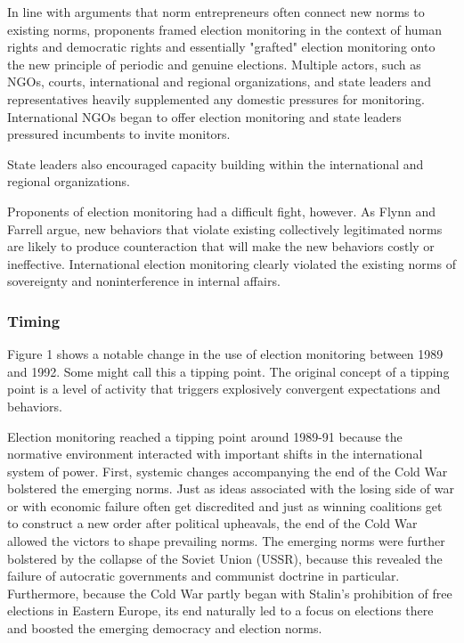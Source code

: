 In line with arguments that norm entrepreneurs often connect new norms to existing norms, proponents framed election monitoring in the context of human rights and democratic rights and essentially "grafted" election monitoring onto the new principle of periodic and genuine elections. Multiple actors, such as NGOs, courts, international and regional organizations, and state leaders and representatives heavily supplemented any domestic pressures for monitoring. International NGOs began to offer election monitoring and state leaders pressured incumbents to invite monitors.

State leaders also encouraged capacity building within the international and regional organizations.

Proponents of election monitoring had a difficult fight, however. As Flynn and Farrell argue, new behaviors that violate existing collectively legitimated norms are likely to produce counteraction that will make the new behaviors costly or ineffective. International election monitoring clearly violated the existing norms of sovereignty and noninterference in internal affairs.

\subsubsection{Timing}
Figure 1 shows a notable change in the use of election monitoring between 1989 and 1992. Some might call this a tipping point. The original concept of a tipping point is a level of activity that triggers explosively convergent expectations and behaviors.

Election monitoring reached a tipping point around 1989-91 because the normative environment interacted with important shifts in the international system of power. First, systemic changes accompanying the end of the Cold War bolstered the emerging norms. Just as ideas associated with the losing side of war or with economic failure often get discredited and just as winning coalitions get to construct a new order after political upheavals, the end of the Cold War allowed the victors to shape prevailing norms. The emerging norms were further bolstered by the collapse of the Soviet Union (USSR), because this revealed the failure of autocratic governments and communist doctrine in particular. Furthermore, because the Cold War partly began with Stalin's prohibition of free elections in Eastern Europe, its end naturally led to a focus on elections there and boosted the emerging democracy and election norms.

